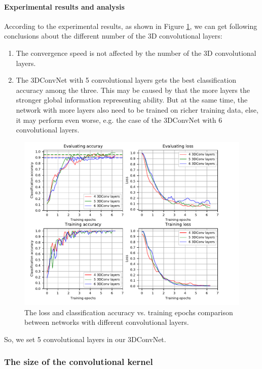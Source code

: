 \paragraph{Experimental results and analysis}
According to the experimental results, as shown in Figure \ref{fig:plot_layers}, we can get following conclusions about the different number of the 3D convolutional layers: 
\begin{enumerate}
	\item The convergence speed is not affected by the number of the 3D convolutional layers.
	\item The 3DConvNet with 5 convolutional layers gets the best classification accuracy among the three. This may be caused by that the more layers the stronger global information representing ability. But at the same time, the network with more layers also need to be trained on richer training data, else, it may perform even worse, e.g. the case of the 3DConvNet with 6 convolutional layers.
\end{enumerate}
\begin{figure}
	\includegraphics[trim=0cm 0cm 0cm 1cm]{fig01/plot_layers.pdf}
	\caption{The loss and classification accuracy vs. training epochs comparison between networks with different convolutional layers.}
	\label{fig:plot_layers}
\end{figure}

So, we set 5 convolutional layers in our 3DConvNet.


\subsubsection{The size of the convolutional kernel}
